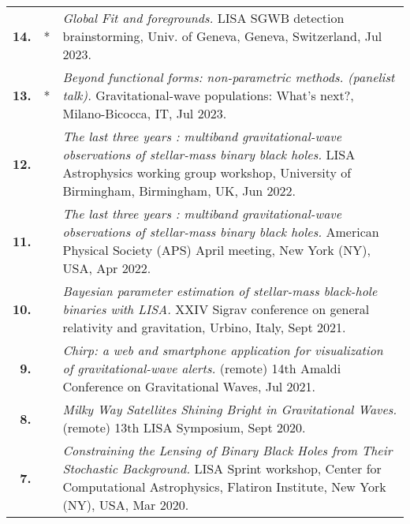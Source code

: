 {\begin{longtable}{rp{0.3cm}p{15.8cm}}
%
\textbf{14.} & * & \textit{Global Fit and foregrounds.}
\newline{}
LISA SGWB detection brainstorming, Univ. of Geneva, Geneva, Switzerland, Jul 2023.
\vspace{0.05cm}\\
%
\textbf{13.} & * & \textit{Beyond functional forms: non-parametric methods. (panelist talk).}
\newline{}
Gravitational-wave populations: What's next?, Milano-Bicocca, IT, Jul 2023.
\vspace{0.05cm}\\
%
\textbf{12.} &  & \textit{The last three years : multiband gravitational-wave observations of stellar-mass binary black holes.}
\newline{}
LISA Astrophysics working group workshop, University of Birmingham, Birmingham, UK, Jun 2022.
\vspace{0.05cm}\\
%
\textbf{11.} &  & \textit{The last three years : multiband gravitational-wave observations of stellar-mass binary black holes.}
\newline{}
American Physical Society (APS) April meeting, New York (NY), USA, Apr 2022.
\vspace{0.05cm}\\
%
\textbf{10.} &  & \textit{Bayesian parameter estimation of stellar-mass black-hole binaries with LISA.}
\newline{}
XXIV Sigrav conference on general relativity and gravitation, Urbino, Italy, Sept 2021.
\vspace{0.05cm}\\
%
\textbf{9.} &  & \textit{Chirp: a web and smartphone application for visualization of gravitational-wave alerts.}
\newline{}
(remote) 14th Amaldi Conference on Gravitational Waves, Jul 2021.
\vspace{0.05cm}\\
%
\textbf{8.} &  & \textit{Milky Way Satellites Shining Bright in Gravitational Waves.}
\newline{}
(remote) 13th LISA Symposium, Sept 2020.
\vspace{0.05cm}\\
%
\textbf{7.} &  & \textit{Constraining the Lensing of Binary Black Holes from Their Stochastic Background.}
\newline{}
LISA Sprint workshop, Center for Computational Astrophysics, Flatiron Institute, New York (NY), USA, Mar 2020.
\vspace{0.05cm}\\

\end{longtable}}
